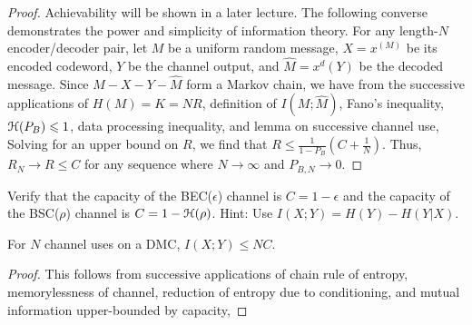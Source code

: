 \documentclass[letterpaper,10pt,english]{article}
\begin{document}
\begin{proof}
Achievability will be shown in a later lecture. 
The following converse demonstrates the power and simplicity of information theory.
For any length-$N$ encoder/decoder pair, let $M$ be a uniform random message, $X = x^{(M)}$ be its encoded codeword, $Y$ be the channel output, and $\hat{M} = x^{d}(Y)$ be the decoded message. 
Since $M - X - Y - \hat{M}$ form a Markov chain, 
we have from the successive applications of $H(M) = K = NR$, definition of $I(M; \hat{M})$, Fano's inequality, $\mathcal{H}(P_B) \leqslant 1$,  data processing inequality, and lemma on successive channel use, 
Solving for an upper bound on $R$, we find that $R \le \frac{1}{1-P_B}\left(C + \frac{1}{N}\right)$. 
Thus, $R_N \to R \le C$ for any sequence where $N \to \infty$ and $P_{B,N} \to 0$. 
\end{proof}
\begin{exerc} 
Verify that the capacity of the BEC($\epsilon$) channel is $C = 1 -\epsilon$ and the capacity
of the BSC($\rho$) channel is $C=1 -\mathcal{H}(\rho)$. 
Hint: Use $I(X;Y)=H(Y)- H(Y|X)$. 
\end{exerc}
\begin{lem}
For $N$ channel uses on a DMC, $I (X;Y ) \le NC$.
\end{lem}   
\begin{proof}
 This follows from successive applications of chain rule of entropy, memorylessness of channel, reduction of entropy due to conditioning, and mutual information upper-bounded by capacity, 
\end{proof}
\end{document}
